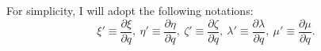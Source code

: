 \documentclass[12pt,a4paper]{article}
\newcommand{\pfird}[2][]{\frac{\partial#1}{\partial#2}}
\begin{document}
For simplicity, I will adopt the following notations:
\begin{equation}
  \xi' \equiv \pfird[\xi]{q},\ \eta' \equiv \pfird[\eta]{q},\ \zeta' \equiv \pfird[\zeta]{q},\ \lambda' \equiv \pfird[\lambda]{q},\ \mu' \equiv \pfird[\mu]{q}.
\end{equation}

\end{document}
